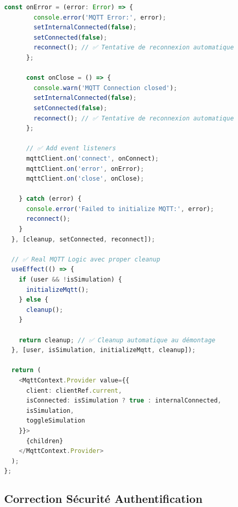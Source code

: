 \documentclass[a4paper,12pt]{article}
\begin{document}
\begin{lstlisting}[language=TypeScript, caption=MQTT Context avec Memory Management Correct]
      const onError = (error: Error) => {
        console.error('MQTT Error:', error);
        setInternalConnected(false);
        setConnected(false);
        reconnect(); // ✅ Tentative de reconnexion automatique
      };
      
      const onClose = () => {
        console.warn('MQTT Connection closed');
        setInternalConnected(false);
        setConnected(false);
        reconnect(); // ✅ Tentative de reconnexion automatique
      };

      // ✅ Add event listeners
      mqttClient.on('connect', onConnect);
      mqttClient.on('error', onError);
      mqttClient.on('close', onClose);

    } catch (error) {
      console.error('Failed to initialize MQTT:', error);
      reconnect();
    }
  }, [cleanup, setConnected, reconnect]);

  // ✅ Real MQTT Logic avec proper cleanup
  useEffect(() => {
    if (user && !isSimulation) {
      initializeMqtt();
    } else {
      cleanup();
    }

    return cleanup; // ✅ Cleanup automatique au démontage
  }, [user, isSimulation, initializeMqtt, cleanup]);

  return (
    <MqttContext.Provider value={{ 
      client: clientRef.current, 
      isConnected: isSimulation ? true : internalConnected, 
      isSimulation, 
      toggleSimulation 
    }}>
      {children}
    </MqttContext.Provider>
  );
};
\end{lstlisting}

\subsection{Correction Sécurité Authentification}
\end{document}
